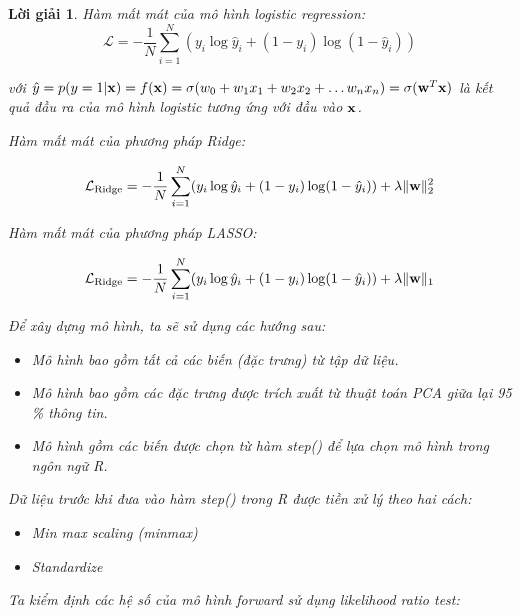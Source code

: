 \documentclass[14pt, a4paper]{article}
\theoremstyle{sltheorem}
\theoremstyle{soltheorem}
\newtheorem*{loigiai}{Lời giải}
\begin{document}
\begin{loigiai}
    Hàm mất mát của mô hình logistic regression:
    \begin{equation*}
        \mathcal{L} = -\dfrac{1}{N}\sum_{i=1}^N (y_i \log \hat{y}_i + (1-y_i)\log(1-\hat{y}_i)) 
    \end{equation*}

    với $\hat{y}=p(y=1\vert \bold{x})=f(\bold{x}) = \sigma(w_0 + w_1 x_1 + w_2 x_2 + \dots w_n x_n) = \sigma(\bold{w}^T \bold{x})$ là kết quả đầu ra của mô hình logistic tương ứng với đầu vào $\bold{x}$.

    Hàm mất mát của phương pháp Ridge:

    \begin{equation*}
        \mathcal{L}_{\mathrm{Ridge}} = -\dfrac{1}{N}\sum_{i=1}^N (y_i \log \hat{y}_i + (1-y_i)\log(1-\hat{y}_i)) + \lambda \lVert \bold{w} \rVert_2^2
    \end{equation*}

    Hàm mất mát của phương pháp LASSO:

    \begin{equation*}
        \mathcal{L}_{\mathrm{Ridge}} = -\dfrac{1}{N}\sum_{i=1}^N (y_i \log \hat{y}_i + (1-y_i)\log(1-\hat{y}_i)) + \lambda \lVert \bold{w} \rVert_1
    \end{equation*}

    Để xây dựng mô hình, ta sẽ sử dụng các hướng sau:

        \begin{itemize}
            \item Mô hình bao gồm tất cả các biến (đặc trưng) từ tập dữ liệu.
            \item Mô hình bao gồm các đặc trưng được trích xuất từ thuật toán PCA giữa lại 95 \% thông tin.
            \item Mô hình gồm các biến được chọn từ hàm step() để lựa chọn mô hình trong ngôn ngữ R.
        \end{itemize}

    Dữ liệu trước khi đưa vào hàm step() trong R được tiền xử lý theo hai cách:

    \begin{itemize}
        \item Min max scaling (minmax)
        \item Standardize
    \end{itemize}

    Ta kiểm định các hệ số của mô hình forward sử dụng likelihood ratio test:


\end{loigiai}
\end{document}
